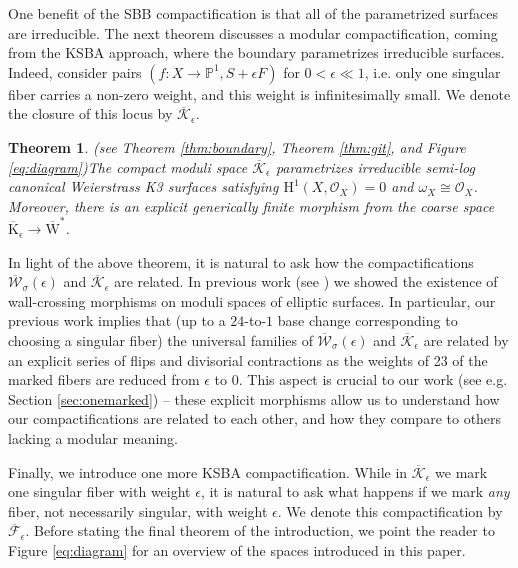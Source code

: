 \documentclass[11pt]{amsart}
\newtheorem{theorem}{Theorem}[section]
\theoremstyle{definition}
\theoremstyle{remark}
\newcommand{\bP}{{\mathbb P}}
\newcommand{\calO}{\mathcal O}
\newcommand{\sbb}{\overline{\mathrm{W}}^{*}}
\newcommand{\ke}{\overline{\mathcal{K}}_{\epsilon}}
\newcommand{\me}{\overline{\mathrm{K}}_\epsilon}
\newcommand{\fe}{\overline{\mathcal{F}}_\epsilon}
\newcommand{\kepsilon}{\overline{\mathcal{W}}_\sigma(\epsilon)}
\newcommand{\km}{\fe}
\begin{document}
	
	
	
	
	One benefit of the SBB compactification is that all of the parametrized surfaces are irreducible. The next theorem discusses a modular compactification, coming from the KSBA approach, where the boundary parametrizes irreducible surfaces. 
	Indeed, consider pairs $(f: X \to \bP^1, S + \epsilon F)$ for $0 < \epsilon \ll 1$, i.e. only one singular fiber carries a non-zero weight, and this weight is infinitesimally small. We denote the closure of this locus by $\ke$. 
	
	
	
	\begin{theorem}(see Theorem \ref{thm:boundary}, Theorem \ref{thm:git}, and Figure \ref{eq:diagram})\label{thm:intro3}
		The compact moduli space $\ke$ parametrizes irreducible semi-log canonical Weierstrass K3 surfaces satisfying $\mathrm{H}^1(X, \calO_X) = 0$ and $\omega_X \cong \calO_X$. Moreover, there is an explicit generically finite morphism from the coarse space $\me \to \sbb$.\end{theorem}
	
	In light of the above theorem, it is natural to ask how the compactifications $\kepsilon$ and $\ke$ are related. In previous work (see \cite{master}) we showed the existence of wall-crossing morphisms on moduli spaces of elliptic surfaces. In particular, our previous work implies that (up to a $24$-to-$1$ base change corresponding to choosing a singular fiber) the universal families of $\kepsilon$ and $\ke$ are related by an explicit series of flips and divisorial contractions as the weights of 23 of the marked fibers are reduced from $\epsilon$ to 0. This aspect is crucial to our work (see e.g. Section \ref{sec:onemarked}) -- these explicit morphisms allow us to understand how our compactifications are related to each other, and how they compare to others lacking a modular meaning.
	
	
	Finally, we introduce one more KSBA compactification. While in $\ke$ we mark one singular fiber with weight $\epsilon$, it is natural to ask what happens if we mark \emph{any} fiber, not necessarily singular, with weight $\epsilon$. We denote this compactification by $\km$. Before stating the final theorem of the introduction, we point the reader to Figure \ref{eq:diagram} for an overview of the spaces introduced in this paper. 
	
\end{document}
